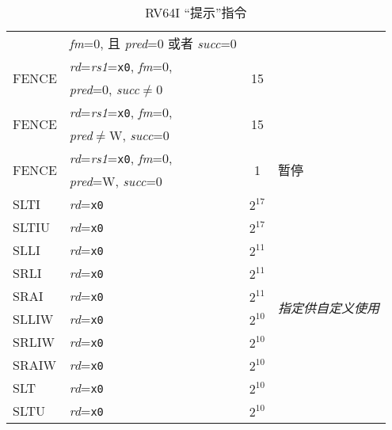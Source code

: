 \begin{table}[hbt]
\begin{tabular}{|l|l|c|l|}
                        & {\em fm}=0, 且 {\em pred}=0 或者 {\em succ}=0                     &                             & \\ \cline{1-3}
  \multirow{2}{*}{FENCE}& {\em rd}={\em rs1}={\tt x0}, {\em fm}=0,    & \multirow{2}{*}{15}         & \\
                        & {\em pred}=0, {\em succ}$\neq$0             &                             & \\ \cline{1-3}
  \multirow{2}{*}{FENCE}& {\em rd}={\em rs1}={\tt x0}, {\em fm}=0,    & \multirow{2}{*}{15}         & \\
                        & {\em pred}$\neq$W, {\em succ}=0             &                             & \\ \hline
  \multirow{2}{*}{FENCE}& {\em rd}={\em rs1}={\tt x0}, {\em fm}=0,    & \multirow{2}{*}{1}          & \multirow{2}{*}{暂停} \\
                        & {\em pred}=W, {\em succ}=0                  &                             & \\ \hline
  SLTI                  & {\em rd}={\tt x0}                           & $2^{17}$                    & \multirow{10}{*}{\em 指定供自定义使用} \\ \cline{1-3}
  SLTIU                 & {\em rd}={\tt x0}                           & $2^{17}$                    & \\ \cline{1-3}
  SLLI                  & {\em rd}={\tt x0}                           & $2^{11}$                    & \\ \cline{1-3}
  SRLI                  & {\em rd}={\tt x0}                           & $2^{11}$                    & \\ \cline{1-3}
  SRAI                  & {\em rd}={\tt x0}                           & $2^{11}$                    & \\ \cline{1-3}
  SLLIW                 & {\em rd}={\tt x0}                           & $2^{10}$                    & \\ \cline{1-3}
  SRLIW                 & {\em rd}={\tt x0}                           & $2^{10}$                    & \\ \cline{1-3}
  SRAIW                 & {\em rd}={\tt x0}                           & $2^{10}$                    & \\ \cline{1-3}
  SLT                   & {\em rd}={\tt x0}                           & $2^{10}$                    & \\ \cline{1-3}
  SLTU                  & {\em rd}={\tt x0}                           & $2^{10}$                    & \\ \hline
\end{tabular}
\caption{RV64I “提示”指令}
\label{tab:rv64i-hints}
\end{table}
